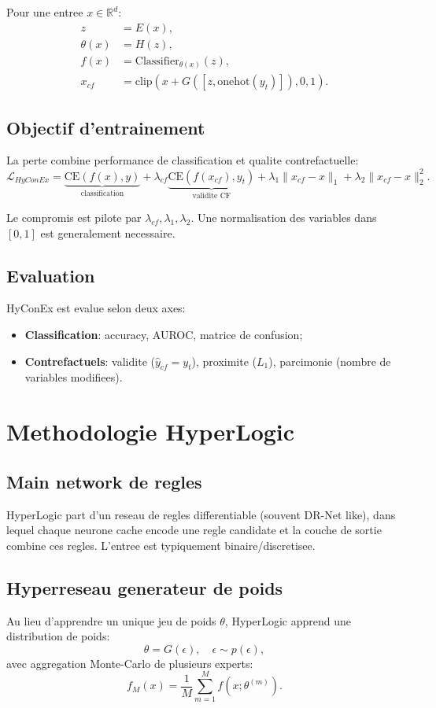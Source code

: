 \documentclass[11pt,a4paper]{article}
\begin{document}
Pour une entree $x \in \mathbb{R}^d$:
\begin{align}
z &= E(x),\\
\theta(x) &= H(z),\\
f(x) &= \text{Classifier}_{\theta(x)}(z),\\
x_{cf} &= \text{clip}\left(x + G\left([z,\text{onehot}(y_t)]\right), 0,1\right).
\end{align}

\subsection{Objectif d'entrainement}
La perte combine performance de classification et qualite contrefactuelle:
\begin{equation}
\mathcal{L}_{HyConEx}
= \underbrace{\text{CE}(f(x),y)}_{\text{classification}}
+ \lambda_{cf}\underbrace{\text{CE}(f(x_{cf}),y_t)}_{\text{validite CF}}
+ \lambda_1\|x_{cf}-x\|_1
+ \lambda_2\|x_{cf}-x\|_2^2.
\end{equation}

Le compromis est pilote par $\lambda_{cf}, \lambda_1, \lambda_2$.
Une normalisation des variables dans $[0,1]$ est generalement necessaire.

\subsection{Evaluation}
HyConEx est evalue selon deux axes:
\begin{itemize}
    \item \textbf{Classification}: accuracy, AUROC, matrice de confusion;
    \item \textbf{Contrefactuels}: validite ($\hat{y}_{cf}=y_t$), proximite ($L_1$), parcimonie (nombre de variables modifiees).
\end{itemize}

\section{Methodologie HyperLogic}
\subsection{Main network de regles}
HyperLogic part d'un reseau de regles differentiable (souvent DR-Net like), dans lequel chaque neurone
cache encode une regle candidate et la couche de sortie combine ces regles.
L'entree est typiquement binaire/discretisee.

\subsection{Hyperreseau generateur de poids}
Au lieu d'apprendre un unique jeu de poids $\theta$, HyperLogic apprend une distribution de poids:
\begin{equation}
\theta = G(\epsilon), \quad \epsilon \sim p(\epsilon),
\end{equation}
avec aggregation Monte-Carlo de plusieurs experts:
\begin{equation}
f_M(x)=\frac{1}{M}\sum_{m=1}^{M} f(x;\theta^{(m)}).
\end{equation}
\end{document}
